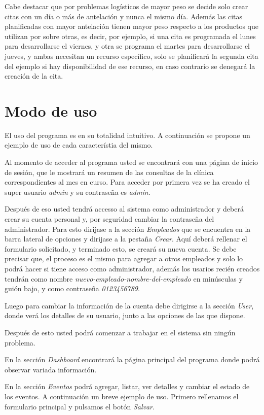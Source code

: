 \documentclass[12pt]{article}
\begin{document}
Cabe destacar que por problemas logísticos de mayor peso se decide solo crear citas con un día o más de antelación y nunca el mismo día. Además las citas planificadas con mayor antelación tienen mayor peso respecto a los productos que utilizan por sobre otras, es decir, por ejemplo, si una cita es programada el lunes para desarrollarse el viernes, y otra se programa el martes para desarrollarse el jueves, y ambas necesitan un recurso específico, solo se planificará la segunda cita del ejemplo si hay disponibilidad de ese recurso, en caso contrario se denegará la creación de la cita.
 
\section{Modo de uso}
 
 El uso del programa es en su totalidad intuitivo. A continuación se propone un ejemplo de uso de cada característia del mismo.
 
 Al momento de acceder al programa usted se encontrará con una página de inicio de sesión, que le mostrará un resumen de las consultas  de la clínica correspondientes al mes en curso. Para acceder por primera vez se ha creado el super usuario \textit{admin} y su contraseña es \textit{admin}.
 
Después de eso usted tendrá accesso al sistema como administrador y deberá crear su cuenta personal y, por seguridad cambiar la contraseña del administrador. Para esto dirijase a la sección \textit{Empleados} que se encuentra en la barra lateral de opciones y dirijase a la pestaña \textit{Crear}. Aquí deberá rellenar el formulario solicitado, y terminado esto, se creará su nueva cuenta. Se debe precisar que, el proceso es el mismo para agregar a otros empleados y solo lo podrá hacer si tiene acceso como administrador, además los usarios recién creados tendrán como nombre \textit{nuevo-empleado-nombre-del-empleado} en minúsculas y guión bajo, y como contraseña \textit{0123456789}. 
 
 Luego para cambiar la información de la cuenta debe dirigirse a la sección \textit{User}, donde verá los detalles de su usuario, junto a las opciones de las que dispone.
 
 Después de esto usted podrá comenzar a trabajar en el sistema sin ningún problema.
 
 En la sección \textit{Dashboard} encontrará la página principal del programa donde podrá observar variada información.
 
 En la  sección \textit{Eventos} podrá agregar, listar, ver detalles y cambiar el estado de los eventos. A continuación un breve ejemplo de uso.
 Primero rellenamos el formulario principal y pulsamos el botón \textit{Salvar}.
 
\end{document}
